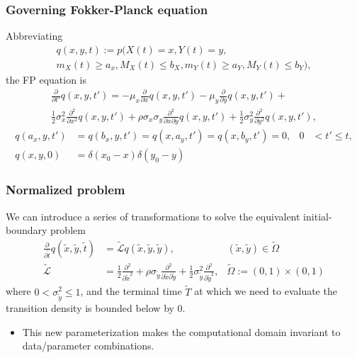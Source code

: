 \documentclass{beamer}
\begin{document}
\begin{frame}
  \frametitle{Governing Fokker-Planck equation}
  Abbreviating 
  \begin{multline*}
    q(x,y,t) := p(X(t) = x, Y(t) = y, \\
    m_X(t) \geq a_x, M_X(t) \leq b_X, m_Y(t) \geq
    a_Y, M_Y(t) \leq b_Y),
  \end{multline*}
  the FP equation is
  \begin{multline*}
    \displaystyle \frac{\partial}{\partial t'} q(x,y,t') = -\mu_x \frac{\partial}{\partial x}q(x,y,t')
    - \mu_y \frac{\partial}{\partial y}q(x,y,t') + \\
    \frac{1}{2}\sigma_x^2 \frac{\partial^2}{\partial x^2}q(x,y,t') + \rho\sigma_x\sigma_y \frac{\partial^2}{\partial x \partial y}q(x,y,t')
    + \frac{1}{2}\sigma_y^2 \frac{\partial^2}{\partial y^2}q(x,y,t'),
  \end{multline*}
  \begin{align*}
    q(a_x, y,t') &= q(b_x,y,t') = q(x,a_y,t') = q(x,b_y,t') = 0, & 0 &< t' \leq t, \\
    q(x,y,0) &= \delta(x_0 - x)\delta(y_0 - y)
  \end{align*}

\end{frame}
\begin{frame}
  \frametitle{Normalized problem}
  We can introduce a series of transformations to solve the equivalent initial-boundary problem
  \begin{align*}
    \frac{\partial}{\partial \tilde{t}} q(\tilde{x},\tilde{y},\tilde{t}) &= \tilde{\mathcal{L}} q(\tilde{x},\tilde{y},\tilde{y}), & (\tilde{x}, \tilde{y}) \in \tilde{\Omega} \\
    \tilde{\mathcal{L}} &= \frac{1}{2} \frac{\partial^2}{\partial \tilde{x}^2} + \rho \sigma_{\tilde{y}} \frac{\partial^2}{\partial \tilde{x} \partial \tilde{y}} + \frac{1}{2} \sigma^2_{\tilde{y}} \frac{\partial^2}{\partial \tilde{y}^2},& \tilde{\Omega} := (0,1) \times (0,1)
  \end{align*}
  where $0 < \sigma_{\tilde{y}}^2 \leq 1$, and the terminal time
  $\tilde{T}$ at which we need to evaluate the transition density is
  bounded below by $0$.

  \begin{itemize}
  \item This new parameterization makes the computational domain invariant
  to data/parameter combinations.
  \end{itemize}
\end{frame}
\end{document}
